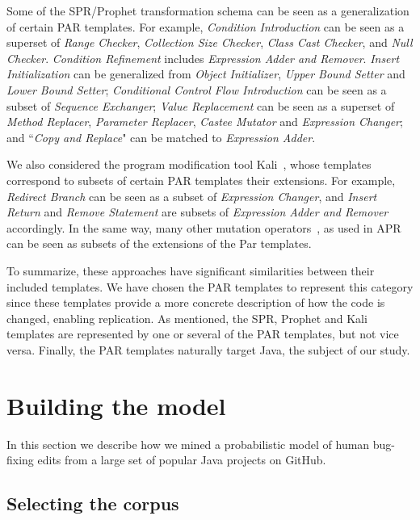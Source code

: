 \documentclass[conference]{IEEEtran}
\begin{document}
Some of the SPR/Prophet transformation schema can be seen as a generalization of certain PAR 
templates. For example, \emph{Condition Introduction} can be seen as a superset of 
\emph{Range Checker}, \emph{Collection Size 
Checker}, \emph{Class Cast Checker}, and \emph{Null Checker}. \emph{Condition Refinement} includes \emph{Expression Adder and Remover}. \emph{Insert Initialization} can be 
generalized from \emph{Object Initializer}, \emph{Upper Bound Setter} and \emph{Lower Bound Setter}; \emph{Conditional Control Flow Introduction} can be 
seen as a subset of \emph{Sequence Exchanger};
\emph{Value Replacement} can be seen as a superset of \emph{Method 
Replacer}, \emph{Parameter Replacer}, \emph{Castee Mutator} and \emph{Expression Changer}; and ``\emph{Copy 
and Replace}" can be matched to \emph{Expression Adder}. 

We also considered the program modification tool Kali~\cite{Qi15}, whose
templates correspond to subsets of certain PAR templates their extensions. 
For example, \emph{Redirect Branch} can be seen as
a subset of \emph{Expression Changer}, and \emph{Insert Return} and \emph{Remove Statement} are
subsets of \emph{Expression Adder and Remover} accordingly. In the same way,
many other mutation operators~\cite{Offutt96,Offutt06}, as used in
APR~\cite{debroy10,xuan16} can be seen as subsets of the extensions of the 
Par templates.

To summarize, these approaches have significant similarities between their
included templates.  We have chosen the PAR templates to represent this category 
since these templates provide a more concrete description of how the code is 
changed, enabling replication. As mentioned, 
the SPR, Prophet and Kali templates are represented by one or several of the PAR
templates, but not vice versa.  Finally, the PAR templates naturally target
Java, the subject of our study. 

\section{Building the model} \label{buildingTheModel}

In this section we describe how we mined a probabilistic
model of human bug-fixing edits from a large set of popular Java projects on GitHub. 

\subsection{Selecting the corpus}
\end{document}
